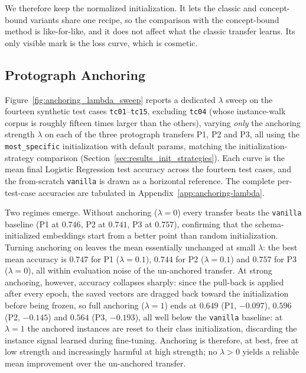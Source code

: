 \documentclass[a4paper,oneside,bibliography=totoc]{scrbook}
\begin{document}
We therefore keep the normalized initialization. It lets the classic and
concept-bound variants share one recipe, so the comparison with the
concept-bound method is like-for-like, and it does not affect what the classic
transfer learns. Its only visible mark is the loss curve, which is cosmetic.

\subsection{Protograph Anchoring}
\label{sec:results_anchoring}

Figure~\ref{fig:anchoring_lambda_sweep} reports a dedicated \(\lambda\) sweep on
the fourteen synthetic test cases \texttt{tc01}--\texttt{tc15}, excluding
\texttt{tc04} (whose instance-walk corpus is roughly fifteen times larger than the
others), varying \emph{only} the anchoring strength \(\lambda\) on each of the
three protograph transfers P1, P2 and P3, all using the \texttt{most\_specific}
initialization with default params, matching the initialization-strategy comparison
(Section~\ref{sec:results_init_strategies}).
Each curve is the mean final Logistic Regression test accuracy across the fourteen
test cases, and the from-scratch \texttt{vanilla} is drawn as a
horizontal reference. The complete per-test-case accuracies are tabulated in
Appendix~\ref{app:anchoring-lambda}.

Two regimes emerge. Without anchoring (\(\lambda=0\)) every transfer beats the
\texttt{vanilla} baseline (P1 at \(0.746\), P2 at \(0.741\), P3 at \(0.757\)),
confirming that the schema-initialized embeddings start from a better point than
random initialization. Turning anchoring on leaves the mean essentially unchanged
at small \(\lambda\): the best mean accuracy is \(0.747\) for P1
(\(\lambda=0.1\)), \(0.744\) for P2 (\(\lambda=0.1\)) and \(0.757\) for P3
(\(\lambda=0\)), all within evaluation noise of the un-anchored transfer. At
strong anchoring, however, accuracy collapses sharply: since the pull-back is
applied after every epoch, the saved vectors are dragged back toward the
initialization before being frozen, so full anchoring (\(\lambda=1\)) ends at
\(0.649\) (P1, \(-0.097\)), \(0.596\) (P2, \(-0.145\)) and \(0.564\) (P3,
\(-0.193\)), all well below the \texttt{vanilla} baseline: at \(\lambda=1\) the
anchored instances are reset to their class initialization, discarding the
instance signal learned during fine-tuning. Anchoring is
therefore, at best, free at low strength and increasingly harmful at high
strength; no \(\lambda>0\) yields a reliable mean improvement over the un-anchored
transfer.
\end{document}
